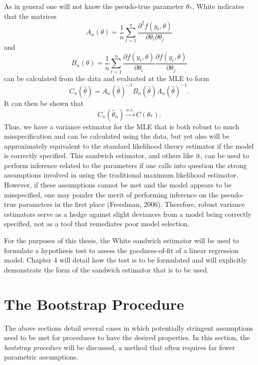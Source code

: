 		As in general one will not know the pseudo-true parameter $\theta_*$, White indicates that the matrices
		\begin{equation*}
			A_n(\theta) = \frac{1}{n} \sum_{t=1}^{n} \frac{\partial^2 f(y_t,\theta)}{\partial \theta_i \partial \theta_j}
		\end{equation*}
		and
		\begin{equation*}
			B_n(\theta) = \frac{1}{n} \sum_{t=1}^{n} \frac{\partial f(y_t,\theta)}{\partial \theta_i} \frac{\partial f(y_t,\theta)}{\partial \theta_j} 
		\end{equation*}
		can be calculated from the data and evaluated at the MLE to form
		\begin{equation*}
			C_n(\hat{\theta}) = A_n(\hat{\theta})^{-1} B_n(\hat{\theta}) A_n(\hat{\theta})^{-1} .
		\end{equation*}
		It can then be shown that 
		\begin{equation*}
			C_n(\hat{\theta}_n) \xrightarrow[]{a.s.} C(\theta_* ) .
		\end{equation*}
		Thus, we have a variance estimator for the MLE that is both robust to much misspecification and can be calculated using the data, but yet also will be approximately equivalent to the standard
		likelihood theory estimator if the model is correctly specified. This sandwich estimator, and others like it, can be used to perform inference related to the parameters if one calls into question
		the strong assumptions involved in using the traditional maximum likelihood estimator. However, if these assumptions cannot be met and the model appears to be misspecified, one may ponder
		the merit of performing inference on the pseudo-true parameters in the first place (Freedman, 2006). Therefore, robust variance estimators serve as a hedge against slight deviances from a model
		being correctly specified, not as a tool that remediates poor model selection.

		For the purposes of this thesis, the White sandwich estimator will be used to formulate a hypothesis test to assess the goodness-of-fit of a linear regression model. Chapter 4 will detail how
		the test is to be formulated and will explicitly demonstrate the form of the sandwich estimator that is to be used.

		\section{The Bootstrap Procedure}

		The above sections detail several cases in which potentially stringent assumptions need to be met for procedures to have the desired properties. In this section, the \textit{bootstrap procedure} will
		be discussed, a method that often requires far fewer parametric assumptions.
		
